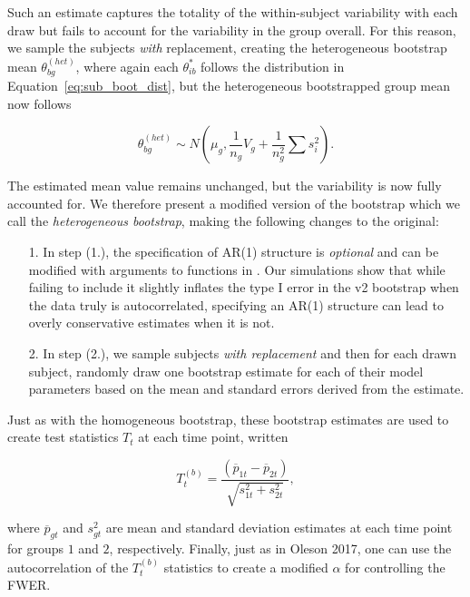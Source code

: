 Such an estimate captures the totality of the within-subject variability with each draw but fails to account for the variability in the group overall. For this reason, we sample the subjects \textit{with} replacement, creating the heterogeneous bootstrap mean $\theta_{bg}^{(het)}$, where again each $\theta_{ib}^*$ follows the distribution in Equation~\ref{eq:sub_boot_dist}, but the heterogeneous bootstrapped group mean now follows

\begin{equation}\label{eq:w_rep_boot}
\theta_{bg}^{(het)} \sim N \left( \mu_{g}, \frac{1}{n_g} V_{g} + \frac{1}{n_g^2} \sum s_i^2 \right).
\end{equation}

The estimated mean value remains unchanged, but the variability is now fully accounted for. We therefore present a modified version of the bootstrap which we call the \textit{heterogeneous bootstrap}, making the following changes to the original: 

\begin{enumerate}
\item[1.] In step (1.), the specification of AR(1) structure is \textit{optional} and can be modified with arguments to functions in . Our simulations show that while failing to include it slightly inflates the type I error in the v2 bootstrap when the data truly is autocorrelated, specifying an AR(1) structure can lead to overly conservative estimates when it is not.
\item[2.] In step (2.), we sample subjects \textit{with replacement} and then for each drawn subject, randomly draw one bootstrap estimate for each of their model parameters based on the mean and standard errors derived from the  estimate.
\end{enumerate}

Just as with the homogeneous bootstrap, these bootstrap estimates are used to create test statistics $T_t$ at each time point, written

\begin{equation}
T_t^{(b)} = \frac{(\overline{p}_{1t} - \overline{p}_{2t})}{\sqrt{s_{1t}^2 + s_{2t}^2}},
\end{equation}

where $\overline{p}_{gt}$ and $s_{gt}^2$ are mean and standard deviation estimates at each time point for groups $1$ and $2$, respectively. Finally, just as in Oleson 2017, one can use the autocorrelation of the $T_t^{(b)}$ statistics to create a modified $\alpha$ for controlling the FWER.



